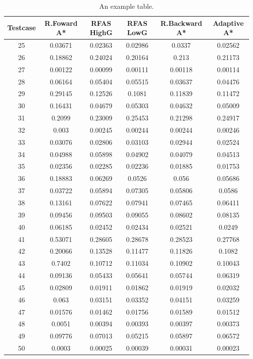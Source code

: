 \documentclass[12pt]{article}
\begin{document}
		\begin{table}[!htb]
			\centering
			\begin{tabular}{|c|c|c|c|c|c|}
				Testcase & R.Foward A* &  RFAS HighG & RFAS LowG & R.Backward A* & Adaptive A*\\\hline
				25&0.03671&0.02363&0.02986&0.0337&0.02562\\
				26&0.18862&0.24024&0.20164&0.213&0.21173\\
				27&0.00122&0.00099&0.00111&0.00118&0.00114\\
				28&0.06164&0.05404&0.05515&0.03637&0.04476\\
				29&0.29145&0.12526&0.1081&0.11839&0.11472\\
				30&0.16431&0.04679&0.05303&0.04632&0.05009\\
				31&0.2099&0.23009&0.25453&0.21298&0.24917\\
				32&0.003&0.00245&0.00244&0.00244&0.00246\\
				33&0.03076&0.02806&0.03103&0.02944&0.02524\\
				34&0.04988&0.05898&0.04902&0.04079&0.04513\\
				35&0.02356&0.02285&0.02236&0.01885&0.01753\\
				36&0.18883&0.06269&0.0526&0.056&0.05686\\
				37&0.03722&0.05894&0.07305&0.05806&0.0586\\
				38&0.13161&0.07622&0.07941&0.07465&0.06411\\
				39&0.09456&0.09503&0.09055&0.08602&0.08135\\
				40&0.06185&0.02452&0.02434&0.02521&0.0249\\
				41&0.53071&0.28605&0.28678&0.28523&0.27768\\
				42&0.20066&0.13528&0.11477&0.11826&0.1082\\
				43&0.7402&0.10712&0.11034&0.10902&0.10043\\
				44&0.09136&0.05433&0.05641&0.05744&0.06319\\
				45&0.02809&0.01911&0.01862&0.01919&0.02032\\
				46&0.063&0.03151&0.03352&0.04151&0.03259\\
				47&0.01576&0.01462&0.01756&0.01589&0.01512\\
				48&0.0051&0.00394&0.00393&0.00397&0.00373\\
				49&0.09776&0.07013&0.05215&0.05897&0.06572\\
				50&0.0003&0.00025&0.00039&0.00031&0.00023\\
			\end{tabular}
			\caption{\label{tab:widgets}An example table.}
		\end{table}
	\iffalse
\end{document}
